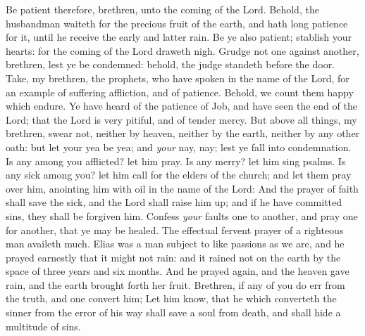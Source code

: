 \documentclass[11pt,letterpaper,oneside]{memoir}
\begin{document}
Be patient therefore, brethren, unto the coming of the Lord. Behold, the 
husbandman waiteth for the precious fruit of the earth, and hath long 
patience for it, until he receive the early and latter rain. Be ye also 
patient; stablish your hearts: for the coming of the Lord draweth nigh. 
Grudge not one against another, brethren, lest ye be condemned: behold, 
the judge standeth before the door. Take, my brethren, the prophets, who 
have spoken in the name of the Lord, for an example of suffering 
affliction, and of patience. Behold, we count them happy which endure. 
Ye have heard of the patience of Job, and have seen the end of the Lord; 
that the Lord is very pitiful, and of tender mercy. But above all 
things, my brethren, swear not, neither by heaven, neither by the earth, 
neither by any other oath: but let your yea be yea; and \emph{your} nay, nay; 
lest ye fall into condemnation. Is any among you afflicted? let him 
pray. Is any merry? let him sing psalms. Is any sick among you? let him 
call for the elders of the church; and let them pray over him, anointing 
him with oil in the name of the Lord: And the prayer of faith shall save 
the sick, and the Lord shall raise him up; and if he have committed 
sins, they shall be forgiven him. Confess \emph{your} faults one to another, 
and pray one for another, that ye may be healed. The effectual fervent 
prayer of a righteous man availeth much. Elias was a man subject to like 
passions as we are, and he prayed earnestly that it might not rain: and 
it rained not on the earth by the space of three years and six months. 
And he prayed again, and the heaven gave rain, and the earth brought 
forth her fruit. Brethren, if any of you do err from the truth, and one 
convert him; Let him know, that he which converteth the sinner from the 
error of his way shall save a soul from death, and shall hide a 
multitude of sins. 
\end{document}
